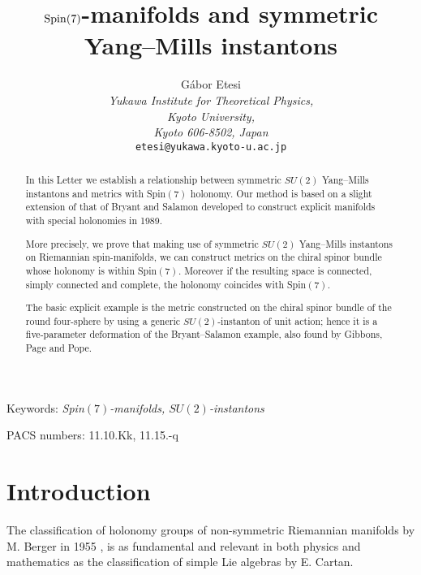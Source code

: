 \documentclass[a4paper,12pt,draft]{article}
\begin{document}
\title{${\rm Spin}(7)$-manifolds and symmetric Yang--Mills instantons}

\author{G\'abor Etesi
\\ {\it Yukawa Institute for Theoretical Physics,}
\\ {\it  Kyoto University,}
\\{\it Kyoto 606-8502, Japan}
\\ {\tt etesi@yukawa.kyoto-u.ac.jp}}

\maketitle

\pagestyle{myheadings}

\thispagestyle{empty}

\begin{abstract}
In this Letter we establish a relationship between symmetric
$SU(2)$ Yang--Mills instantons and metrics with Spin$(7)$ holonomy. 
Our method is based on a slight extension of that of Bryant and
Salamon developed to construct explicit manifolds with special holonomies
in 1989.

More precisely, we prove that making use of symmetric $SU(2)$ Yang--Mills
instantons on Riemannian spin-manifolds, we can construct metrics on the
chiral spinor bundle whose holonomy is within Spin$(7)$. Moreover if the
resulting space is connected, simply connected and complete, the
holonomy coincides with Spin$(7)$. 

The basic explicit example is the metric constructed on the chiral spinor 
bundle of the round four-sphere by using a generic $SU(2)$-instanton
of unit action; hence it is a five-parameter deformation of the
Bryant--Salamon example, also found by Gibbons, Page and Pope. 

\end{abstract}
\centerline{Keywords: {\it {\rm Spin}$(7)$-manifolds, $SU(2)$-instantons}}
\centerline{PACS numbers: 11.10.Kk, 11.15.-q}

\section{Introduction}
The classification of holonomy groups of non-symmetric
Riemannian manifolds by M. Berger in 1955 \cite{ber}, is as fundamental
and relevant in both physics and mathematics as the classification of
simple Lie algebras by E. Cartan. 
\end{document}
